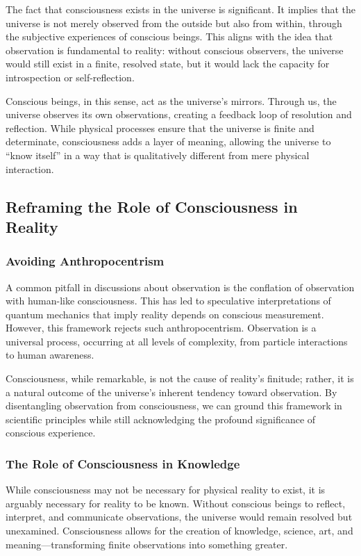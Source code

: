 \documentclass[12pt]{article}
\begin{document}
The fact that consciousness exists in the universe is significant. It implies that the universe is not merely observed from the outside but also from within, through the subjective experiences of conscious beings. This aligns with the idea that observation is fundamental to reality: without conscious observers, the universe would still exist in a finite, resolved state, but it would lack the capacity for introspection or self-reflection.

Conscious beings, in this sense, act as the universe’s mirrors. Through us, the universe observes its own observations, creating a feedback loop of resolution and reflection. While physical processes ensure that the universe is finite and determinate, consciousness adds a layer of meaning, allowing the universe to ``know itself'' in a way that is qualitatively different from mere physical interaction.

\subsection{Reframing the Role of Consciousness in Reality}

\subsubsection{Avoiding Anthropocentrism}

A common pitfall in discussions about observation is the conflation of observation with human-like consciousness. This has led to speculative interpretations of quantum mechanics that imply reality depends on conscious measurement. However, this framework rejects such anthropocentrism. Observation is a universal process, occurring at all levels of complexity, from particle interactions to human awareness.

Consciousness, while remarkable, is not the cause of reality’s finitude; rather, it is a natural outcome of the universe’s inherent tendency toward observation. By disentangling observation from consciousness, we can ground this framework in scientific principles while still acknowledging the profound significance of conscious experience.

\subsubsection{The Role of Consciousness in Knowledge}

While consciousness may not be necessary for physical reality to exist, it is arguably necessary for reality to be known. Without conscious beings to reflect, interpret, and communicate observations, the universe would remain resolved but unexamined. Consciousness allows for the creation of knowledge, science, art, and meaning—transforming finite observations into something greater.
\end{document}
